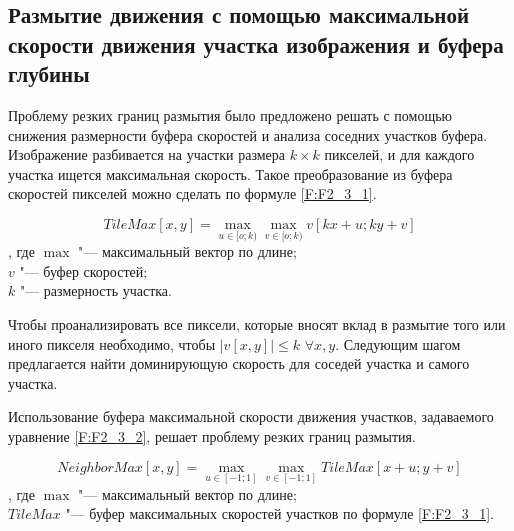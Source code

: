 \subsection{Размытие движения с помощью максимальной скорости движения участка изображения и буфера глубины}
\label{cha:analysis_mcgiure}

Проблему резких границ размытия было предложено решать с помощью снижения размерности буфера скоростей и анализа соседних участков буфера. Изображение разбивается на участки размера $k \times k$ пикселей, и для каждого участка ищется максимальная скорость. Такое преобразование из буфера скоростей пикселей можно сделать по формуле \eqref{F:F2_3_1}.
\begin{eqndesc}
    \begin{equation}\label{F:F2_3_1}
        TileMax[x,y] = \max_{u \in [o ; k)} {
        \max_{v \in [o ; k)} {v [kx + u; ky + v]}
        }
    \end{equation}
    , где $\max$ "--- максимальный вектор по длине; \\
    $v$ "---  буфер скоростей;\\
    $k$ "---  размерность участка.

\end{eqndesc}

Чтобы проанализировать все пиксели, которые вносят вклад в размытие того или иного пикселя необходимо, чтобы $|v[x,y]| \le k $ \space $\forall x,y $. Следующим шагом предлагается найти доминирующую скорость для соседей участка и самого участка.


Использование буфера максимальной скорости движения участков, задаваемого уравнение \eqref{F:F2_3_2}, решает проблему резких границ размытия.

\begin{eqndesc}
    \begin{equation}\label{F:F2_3_2}
        NeighborMax[x,y] = \max_{u \in [-1 ; 1]} {
            \max_{v \in [-1 ;1]} {TileMax [x + u; y + v]}
        }
    \end{equation}
    , где $\max$ "--- максимальный вектор по длине; \\
    $TileMax$ "---  буфер максимальных скоростей участков по формуле \eqref{F:F2_3_1}.
\end{eqndesc}

